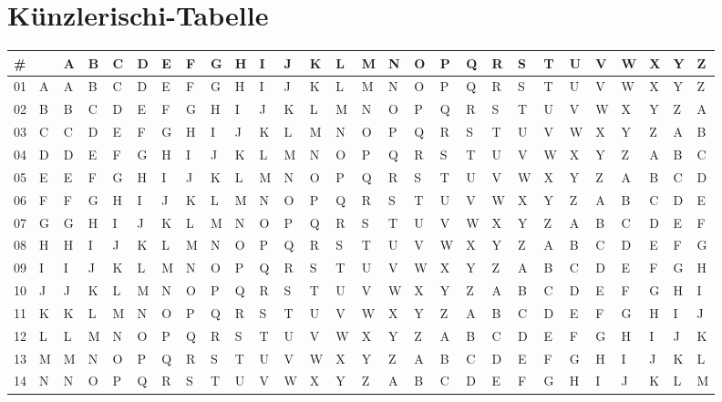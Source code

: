 \documentclass[landscape,twocolumn,a4paper]{article}
\begin{document}
\section{Künzlerischi-Tabelle}
{
\setlength{\tabcolsep}{0.15em}
\begin{tabular}{l l| l l l l l l l l l l l l l l l l l l l l l l l l l l}
\# &  & A & B & C & D & E & F & G & H & I & J & K & L & M & N & O & P & Q & R & S & T & U & V & W & X & Y & Z\\
\hline
01 & A & A & B & C & D & E & F & G & H & I & J & K & L & M & N & O & P & Q & R & S & T & U & V & W & X & Y & Z\\
02 & B & B & C & D & E & F & G & H & I & J & K & L & M & N & O & P & Q & R & S & T & U & V & W & X & Y & Z & A\\
03 & C & C & D & E & F & G & H & I & J & K & L & M & N & O & P & Q & R & S & T & U & V & W & X & Y & Z & A & B\\
04 & D & D & E & F & G & H & I & J & K & L & M & N & O & P & Q & R & S & T & U & V & W & X & Y & Z & A & B & C\\
05 & E & E & F & G & H & I & J & K & L & M & N & O & P & Q & R & S & T & U & V & W & X & Y & Z & A & B & C & D\\
06 & F & F & G & H & I & J & K & L & M & N & O & P & Q & R & S & T & U & V & W & X & Y & Z & A & B & C & D & E\\
07 & G & G & H & I & J & K & L & M & N & O & P & Q & R & S & T & U & V & W & X & Y & Z & A & B & C & D & E & F\\
08 & H & H & I & J & K & L & M & N & O & P & Q & R & S & T & U & V & W & X & Y & Z & A & B & C & D & E & F & G\\
09 & I & I & J & K & L & M & N & O & P & Q & R & S & T & U & V & W & X & Y & Z & A & B & C & D & E & F & G & H\\
10 & J & J & K & L & M & N & O & P & Q & R & S & T & U & V & W & X & Y & Z & A & B & C & D & E & F & G & H & I\\
11 & K & K & L & M & N & O & P & Q & R & S & T & U & V & W & X & Y & Z & A & B & C & D & E & F & G & H & I & J\\
12 & L & L & M & N & O & P & Q & R & S & T & U & V & W & X & Y & Z & A & B & C & D & E & F & G & H & I & J & K\\
13 & M & M & N & O & P & Q & R & S & T & U & V & W & X & Y & Z & A & B & C & D & E & F & G & H & I & J & K & L\\
14 & N & N & O & P & Q & R & S & T & U & V & W & X & Y & Z & A & B & C & D & E & F & G & H & I & J & K & L & M\\

\end{tabular}}
\end{document}
